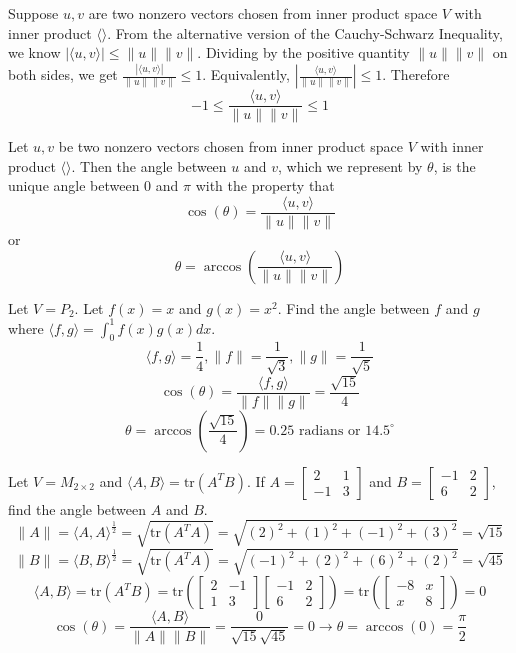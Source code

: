 \documentclass[12pt]{article}
\begin{document}
Suppose $u, v$ are two nonzero vectors chosen from inner product space $V$ with inner product $\langle \rangle$. From the alternative version of the Cauchy-Schwarz Inequality, we know $|\langle u, v \rangle| \leq \|u\| \|v\|$. Dividing by the positive quantity $\|u\| \|v\|$ on both sides, we get $\frac{|\langle u, v \rangle|}{\|u\| \|v\|} \leq 1$. Equivalently, $|\frac{\langle u, v \rangle}{\|u\| \|v\|}| \leq 1$. Therefore $$ -1 \leq \frac{\langle u, v \rangle}{\|u\| \|v\|} \leq 1$$ 
\begin{definition} Let $u, v$ be two nonzero vectors chosen from inner product space $V$ with inner product $\langle \rangle$. Then the angle between $u$ and $v$, which we represent by $\theta$, is the unique angle between $0$ and $\pi$ with the property that $$\cos(\theta) = \frac{\langle u, v \rangle}{\|u\| \|v\|} $$ or $$\theta = \arccos(\frac{\langle u, v \rangle}{\|u\| \|v\|}) $$ \end{definition} 
\begin{example} Let $V = P_2$. Let $f(x) = x$ and $g(x) = x^2$. Find the angle between $f$ and $g$ where $\langle f, g \rangle = \int_0^1 f(x)g(x)dx$. 
$$\langle f, g \rangle = \frac{1}{4}, \|f\| = \frac{1}{\sqrt{3}}, \|g\| = \frac{1}{\sqrt{5}} $$ $$\cos(\theta) = \frac{\langle f, g\rangle}{\|f\| \|g\|} = \frac{\sqrt{15}}{4} $$
$$\theta = \arccos(\frac{\sqrt{15}}{4}) = 0.25\text{ radians or } 14.5^\circ$$ \end{example} 
\begin{example} Let $V = M_{2 \times 2}$ and $\langle A, B \rangle = \mathrm{tr}(A^TB)$. If $A = \begin{bmatrix} 2 & 1 \\ -1 & 3 \end{bmatrix}$ and $B = \begin{bmatrix} -1 & 2 \\ 6 & 2 \end{bmatrix}$, find the angle between $A$ and $B$. $$\|A\| = \langle A, A\rangle^\frac{1}{2} = \sqrt{\mathrm{tr}(A^TA)} = \sqrt{(2)^2 + (1)^2 + (-1)^2 + (3)^2} = \sqrt{15} $$ $$ \|B\| = \langle B, B\rangle^\frac{1}{2} = \sqrt{\mathrm{tr}(A^TA)} = \sqrt{(-1)^2 + (2)^2 + (6)^2 + (2)^2} = \sqrt{45} $$ 
$$\langle A, B\rangle = \mathrm{tr}(A^TB) = \mathrm{tr}(\begin{bmatrix} 2 & -1 \\ 1 & 3 \end{bmatrix}\begin{bmatrix} -1 & 2 \\ 6 & 2 \end{bmatrix}) = \mathrm{tr}(\begin{bmatrix} -8 & x \\ x & 8 \end{bmatrix}) = 0 $$
$$ \cos(\theta) = \frac{\langle A, B\rangle}{\|A\| \|B\|} = \frac{0}{\sqrt{15}\sqrt{45}} = 0 \rightarrow \theta = \arccos(0) = \frac{\pi}{2} $$ \end{example} 
\end{document}
